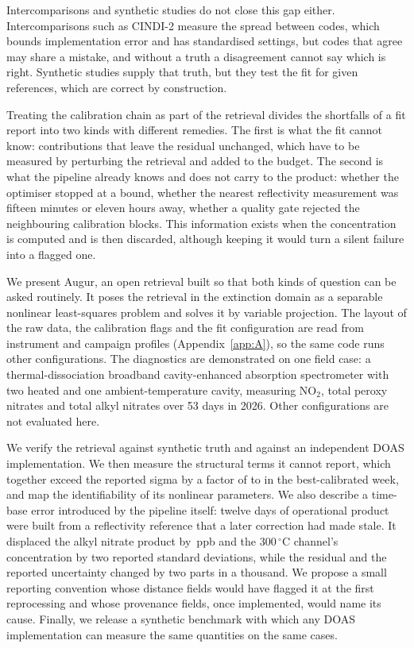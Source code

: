 Intercomparisons and synthetic studies do not close this gap either. Intercomparisons such as CINDI-2
\citep{Kreher_2020} measure the spread between codes, which bounds implementation error and has standardised settings,
but codes that agree may share a mistake, and without a truth a disagreement cannot say which is right. Synthetic
studies supply that truth, but they test the fit for given references, which are correct by construction.

Treating the calibration chain as part of the retrieval divides the shortfalls of a fit report into two kinds with
different remedies. The first is what the fit cannot know: contributions that leave the residual unchanged, which have
to be measured by perturbing the retrieval and added to the budget. The second is what the pipeline already knows and
does not carry to the product: whether the optimiser stopped at a bound, whether the nearest reflectivity measurement
was fifteen minutes or eleven hours away, whether a quality gate rejected the neighbouring calibration blocks. This
information exists when the concentration is computed and is then discarded, although keeping it would turn a silent
failure into a flagged one.

We present Augur, an open retrieval built so that both kinds of question can be asked routinely. It poses the retrieval
in the extinction domain as a separable nonlinear least-squares problem and solves it by variable projection. The
layout of the raw data, the calibration flags and the fit configuration are read from instrument and campaign profiles
(Appendix~\ref{app:A}), so the same code runs other configurations. The diagnostics are demonstrated on one field case:
a thermal-dissociation broadband cavity-enhanced absorption spectrometer with two heated and one ambient-temperature
cavity, measuring NO$_2$, total peroxy nitrates and total alkyl nitrates over 53 days in 2026. Other configurations are
not evaluated here.

We verify the retrieval against synthetic truth and against an independent DOAS implementation. We then measure the
structural terms it cannot report, which together exceed the reported sigma by a factor of  to  in the
best-calibrated week, and map the identifiability of its nonlinear parameters. We also describe a time-base error introduced by the pipeline itself: twelve days of operational product were built
from a reflectivity reference that a later correction had made stale. It displaced the alkyl nitrate product by
\,ppb and the 300\,$^{\circ}$C channel's concentration by two reported standard deviations, while the residual and the
reported uncertainty changed by two parts in a thousand. We propose a small reporting convention whose distance
fields would have flagged it at the first reprocessing and whose provenance fields, once implemented, would name its
cause. Finally, we release a synthetic benchmark with which any DOAS implementation can measure the same quantities on
the same cases.

